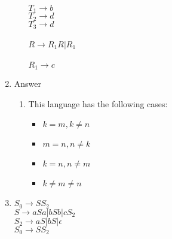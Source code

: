\documentclass{article}
\begin{document}
\begin{enumerate}
\begin{enumerate}
				$T_1 \rightarrow b$\\ $T_2 \rightarrow d$\\$T_3 \rightarrow d$\\\\

				$R \rightarrow R_1R | R_1$\\\\
				$R_1 \rightarrow c$\\
			\end{enumerate}
		\item Answer \begin{enumerate}
			\item This language has the following cases:
				\begin{itemize}
					\item$k=m, k \neq n$
					\item$m=n, n \neq k$
					\item$k=n, n \neq m$
					\item$k \neq m \neq n$
				\end{itemize}
			\end{enumerate}
		\item $S_0 \rightarrow SS_2$\\
			$S \rightarrow aSa | bSb | cS_2$\\
			$S_2 \rightarrow aS | bS | \epsilon$\\
			$S_0 \rightarrow SS_2$\\
	\end{enumerate}
\end{document}
